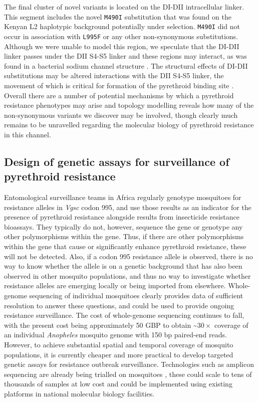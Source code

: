 \documentclass[a4paper,11pt,abstracton,hidelinks]{scrartcl}
\begin{document}
%
The final cluster of novel variants is located on the DI-DII intracellular linker. 
%
This segment includes the novel \texttt{M490I} substitution that was found on the Kenyan L2 haplotypic background potentially under selection.
%
\texttt{M490I} did not occur in association with \texttt{L995F} or any other non-synonymous substitutions.
%
Although we were unable to model this region, we speculate that the DI-DII linker passes under the DII S4-S5 linker and these regions may interact, as was found in a bacterial sodium channel structure \cite{Sula2017}.
%
The structural effects of DI-DII substitutions may be altered interactions with the DII S4-S5 linker, the movement of which is critical for formation of the pyrethroid binding site \cite{OReilly2006, Usherwood2007}. 
%
Overall there are a number of potential mechanisms by which a pyrethroid resistance phenotypes may arise and topology modelling reveals how many of the non-synonymous variants we discover may be involved, though clearly much remains to be unravelled regarding the molecular biology of pyrethroid resistance in this channel.


\subsection*{Design of genetic assays for surveillance of pyrethroid resistance}

%
Entomological surveillance teams in Africa regularly genotype mosquitoes for resistance alleles in \textit{Vgsc} codon 995, and use those results as an indicator for the presence of pyrethroid resistance alongside results from insecticide resistance bioassays.
%
They typically do not, however, sequence the gene or genotype any other polymorphisms within the gene.
%
Thus, if there are other polymorphisms within the gene that cause or significantly enhance pyrethroid resistance, these will not be detected.
%
Also, if a codon 995 resistance allele is observed, there is no way to know whether the allele is on a genetic background that has also been observed in other mosquito populations, and thus no way to investigate whether resistance alleles are emerging locally or being imported from elsewhere.
%
Whole-genome sequencing of individual mosquitoes clearly provides data of sufficient resolution to answer these questions, and could be used to provide ongoing resistance surveillance.
%
The cost of whole-genome sequencing continues to fall, with the present cost being approximately 50 GBP to obtain \textasciitilde$30\times$ coverage of an individual \emph{Anopheles} mosquito genome with 150 bp paired-end reads.
%
However, to achieve substantial spatial and temporal coverage of mosquito populations, it is currently cheaper and more practical to develop targeted genetic assays for resistance outbreak surveillance.
%
Technologies such as amplicon sequencing \cite{Kilianski2015} are already being trialled on mosquitoes \cite{lucas2019high}, these could scale to tens of thousands of samples at low cost and could be implemented using existing platforms in national molecular biology facilities.
%
\end{document}
